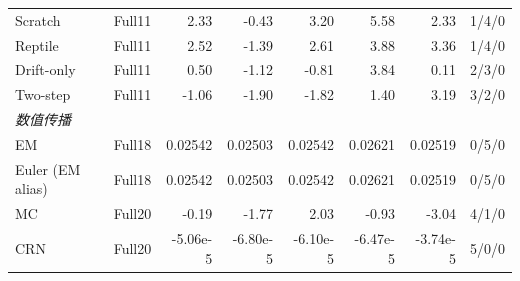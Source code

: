\begin{longtable}{@{}p{.22\linewidth}p{.07\linewidth}rrrrrr@{}}
Scratch & Full11 & 2.33 & -0.43 & 3.20 & 5.58 & 2.33 & 1/4/0\\
Reptile & Full11 & 2.52 & -1.39 & 2.61 & 3.88 & 3.36 & 1/4/0\\
Drift-only & Full11 & 0.50 & -1.12 & -0.81 & 3.84 & 0.11 & 2/3/0\\
Two-step & Full11 & -1.06 & -1.90 & -1.82 & 1.40 & 3.19 & 3/2/0\\
\multicolumn{8}{l}{\textit{数值传播}}\\
EM & Full18 & 0.02542 & 0.02503 & 0.02542 & 0.02621 & 0.02519 & 0/5/0\\
Euler (EM alias) & Full18 & 0.02542 & 0.02503 & 0.02542 & 0.02621 & 0.02519 & 0/5/0\\
MC & Full20 & -0.19 & -1.77 & 2.03 & -0.93 & -3.04 & 4/1/0\\
CRN & Full20 & -5.06e-5 & -6.80e-5 & -6.10e-5 & -6.47e-5 & -3.74e-5 & 5/0/0\\
\end{longtable}
\endgroup
